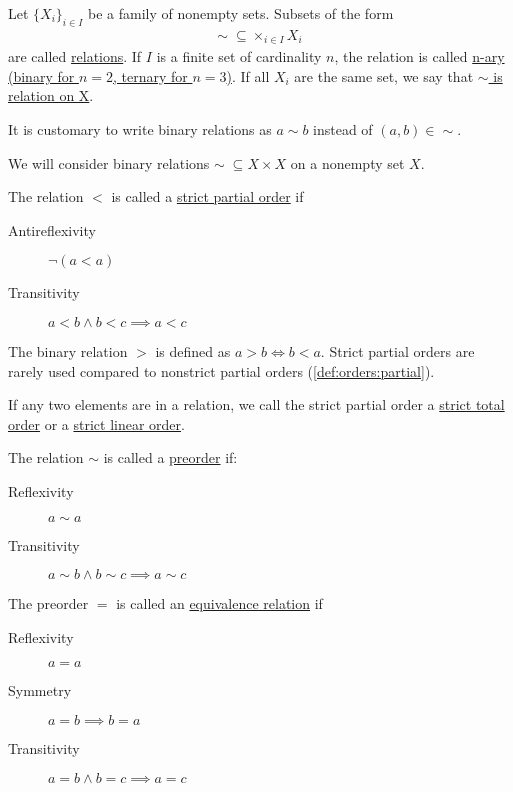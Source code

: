 \begin{definition}\label{def:relations}
  Let $\{ X_i \}_{i \in I}$ be a family of nonempty sets.
  Subsets of the form
  \begin{align*}
    \sim\; \subseteq \times_{i \in I} X_i
  \end{align*}
  are called \uline{relations}. If $I$ is a finite set of cardinality $n$, the relation is called \uline{n-ary (binary for $n = 2$, ternary for $n = 3$)}. If all $X_i$ are the same set, we say that \uline{$\sim$ is relation on X}.

  It is customary to write binary relations as $a \sim b$ instead of $(a, b) \in \sim$.
\end{definition}

\begin{definition}\label{def:orders}
  We will consider binary relations $\sim\; \subseteq X \times X$ on a nonempty set $X$.

  \begin{defenum}
    \item\label{def:orders:strict_partial} The relation $<$ is called a \uline{strict partial order} if
    \begin{description}
      \item[Antireflexivity] $\lnot(a < a)$
      \item[Transitivity] $a < b \land b < c \implies a < c$
    \end{description}

    The binary relation $>$ is defined as $a > b \iff b < a$. Strict partial orders are rarely used compared to nonstrict partial orders (\cref{def:orders:partial}).

    If any two elements are in a relation, we call the strict partial order a \uline{strict total order} or a \uline{strict linear order}.

    \item\label{def:orders:preorder} The relation $\sim$ is called a \uline{preorder} if:
    \begin{description}
      \item[Reflexivity] $a \sim a$
      \item[Transitivity] $a \sim b \land b \sim c \implies a \sim c$
    \end{description}

    \item\label{def:orders:equivalence} The preorder $=$ is called an \uline{equivalence relation} if
    \begin{description}
      \item[Reflexivity] $a = a$
      \item[Symmetry] $a = b \implies b = a$
      \item[Transitivity] $a = b \land b = c \implies a = c$
    \end{description}


\end{defenum}
\end{definition}
